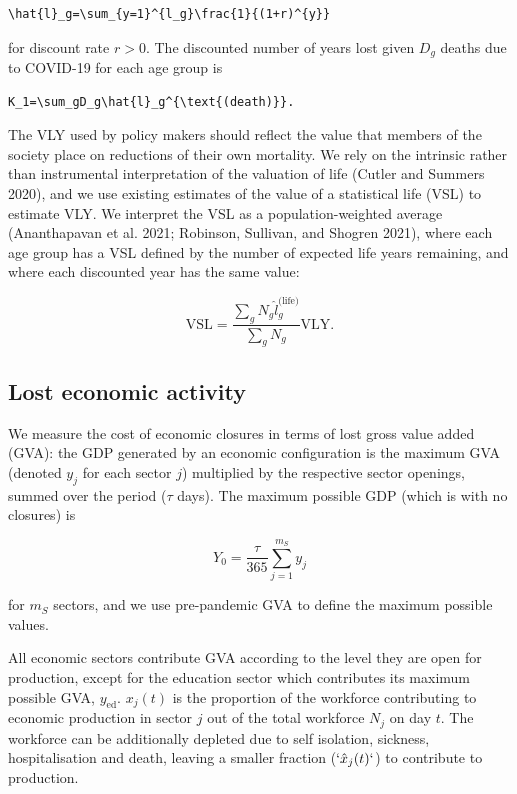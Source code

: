 \documentclass[
]{article}
\begin{document}
\begin{verbatim}
\hat{l}_g=\sum_{y=1}^{l_g}\frac{1}{(1+r)^{y}}
\end{verbatim}

for discount rate \(r>0\). The discounted number of years lost given \(D_g\) deaths due to COVID-19 for each age group is

\begin{verbatim}
K_1=\sum_gD_g\hat{l}_g^{\text{(death)}}.
\end{verbatim}

The VLY used by policy makers should reflect the value that members of the society place on reductions of their own mortality.
We rely on the intrinsic rather than instrumental interpretation of the valuation of life (Cutler and Summers 2020), and we use existing estimates of the value of a statistical life (VSL) to estimate VLY. We interpret the VSL as a population-weighted average (Ananthapavan et al. 2021; Robinson, Sullivan, and Shogren 2021), where each age group has a VSL defined by the number of expected life years remaining, and where each discounted year has the same value:

\begin{equation}
\text{VSL}=\frac{\sum_gN_g\hat{l}_g^{\text{(life)}}}{\sum_gN_g}\text{VLY}.
\end{equation}

\hypertarget{lost-economic-activity}{%
\subsection{Lost economic activity}\label{lost-economic-activity}}

We measure the cost of economic closures in terms of lost gross value added (GVA): the GDP generated by an economic configuration is the maximum GVA (denoted \(y_j\) for each sector \(j\)) multiplied by the respective sector openings, summed over the period (\(\tau\) days). The maximum possible GDP (which is with no closures) is

\[Y_0=\frac{\tau}{365}\sum_{j=1}^{m_S}y_j\]

for \(m_S\) sectors, and we use pre-pandemic GVA to define the maximum possible values.

All economic sectors contribute GVA according to the level they are open for production, except for the education sector which contributes its maximum possible GVA, \(y_{\text{ed}}\). \(x_{j}(t)\) is the proportion of the workforce contributing to economic production in sector \(j\) out of the total workforce \(N_j\) on day \(t\). The workforce can be additionally depleted due to self isolation, sickness, hospitalisation and death, leaving a smaller fraction (\(`\hat{x}_{j}(t)`\)) to contribute to production.
\end{document}
